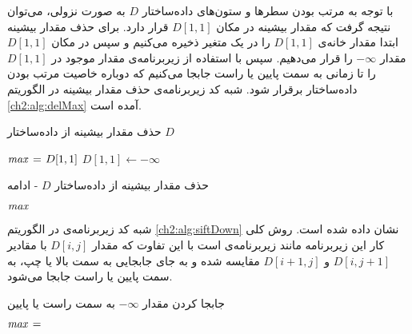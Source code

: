 با توجه به مرتب بودن سطرها و ستون‌های داده‌ساختار {$D$} به صورت نزولی، می‌توان نتیجه گرفت که مقدار بیشینه در مکان {$D[1,1]$} قرار دارد. برای حذف مقدار بیشینه ابتدا مقدار خانه‌ی {$D[1,1]$} را در یک متغیر ذخیره می‌کنیم و سپس در مکان {$D[1,1]$} مقدار  {$-\infty$} را قرار می‌دهیم. سپس با استفاده از زیربرنامه‌ی {} مقدار موجود در {$D[1,1]$} را تا زمانی به سمت پایین یا راست جابجا می‌کنیم که دوباره خاصیت مرتب بودن داده‌ساختار برقرار شود. شبه کد زیربرنامه‌ی حذف مقدار بیشینه در الگوریتم {\eqref{ch2:alg:delMax}} آمده است.
\begin{algorithm}[H]
\caption{حذف مقدار بیشینه از داده‌ساختار {$D$}}\label{ch2:alg:delMax}
\begin{latin}
\begin{algorithmic}[1]
		\State	$\mathit{max} \mathrel{\hspace{1pt}=\hspace{1pt}} D[1,1]$
		\State	$D[1,1] \gets -\infty$
\end{algorithmic}
\end{latin}
\end{algorithm}

\begin{algorithm}
\caption*{حذف مقدار بیشینه از داده‌ساختار {$D$} - ادامه}
\begin{latin}
\begin{algorithmic}[1]
		\State	{}
		\State	\Return $\mathit{max}$	
\EndProcedure
\end{algorithmic}
\end{latin}
\end{algorithm}

شبه کد زیربرنامه‌ی {} در الگوریتم {\eqref{ch2:alg:siftDown}} نشان داده شده است.  روش کلی کار این زیربرنامه‌ مانند زیربرنامه‌ی {} است با این تفاوت که مقدار {$D[i,j]$} با مقادیر {$D[i,j+1]$} و {$D[i+1,j]$} مقایسه شده و به جای جابجایی به سمت بالا یا چپ، به سمت پایین یا راست جابجا می‌شود.
\begin{algorithm}
\caption{جابجا کردن مقدار {$-\infty$} به سمت راست یا پایین}\label{ch2:alg:siftDown}
\begin{latin}
\begin{algorithmic}[1]
		\State	$\mathit{max} \mathrel{\hspace{1pt}=\hspace{1pt}}$ 
				\State	\Return
				\State	{}
				\State	{}
		\Else
				\State	{}
				\State	{}
		\EndIf
\EndProcedure
\end{algorithmic}
\end{latin}
\end{algorithm}

